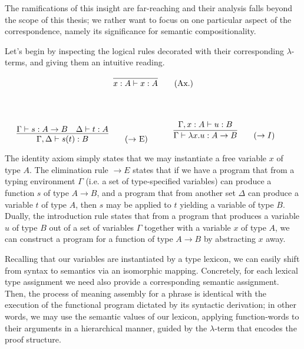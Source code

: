 The ramifications of this insight are far-reaching and their analysis falls beyond the scope of this thesis; we rather want to focus on one particular aspect of the correspondence, namely its significance for semantic compositionality.

Let's begin by inspecting the logical rules decorated with their corresponding $\lambda$-terms, and giving them an intuitive reading.

\begin{center}
\begin{minipage}{0.5\textwidth}
\[
\infer{x: A \vdash x: A}{}\tag{Ax.}
\]
\end{minipage}\\
\end{center}
\begin{align*}
    \begin{minipage}{0.5\textwidth}
	\[
        \infer{\Gamma, \Delta \vdash s(t): B}{
            \Gamma \vdash s: A \rightarrow B
            &
            \Delta \vdash t: A
        }\tag{$\rightarrow$ E}
    \]
    \end{minipage}
    \begin{minipage}{0.5\textwidth}
    \[
        \infer{\Gamma \vdash \lambda x. u : A \rightarrow B}{
            \Gamma, x: A \vdash u: B
        }\tag{$\rightarrow I$}\\
    \]
    \end{minipage}
\end{align*}

The identity axiom simply states that we may instantiate a free variable $x$ of type $A$.
The elimination rule $\rightarrow E$ states that if we have a program that from a typing environment $\Gamma$ (i.e. a set of type-specified variables) can produce a function $s$ of type $A \to B$, and a program that from another set $\Delta$ can produce a variable $t$ of type $A$, then $s$ may be applied to $t$ yielding a variable of type $B$.
Dually, the introduction rule states that from a program that produces a variable $u$ of type $B$ out of a set of variables $\Gamma$ together with a variable $x$ of type $A$, we can construct a program for a function of type $A\to B$ by abstracting $x$ away.

Recalling that our variables are instantiated by a type lexicon, we can easily shift from syntax to semantics via an isomorphic mapping.
Concretely, for each lexical type assignment we need also provide a corresponding semantic assignment.
Then, the process of meaning assembly for a phrase is identical with the execution of the functional program dictated by its syntactic derivation; in other words, we may use the semantic values of our lexicon, applying function-words to their arguments in a hierarchical manner, guided by the $\lambda$-term that encodes the proof structure.


